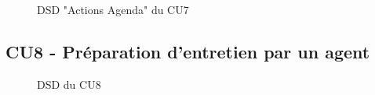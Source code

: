 \begin{figure}[H]
\noindent{}
\caption{DSD "Actions Agenda" du CU7}
\modificationFigure{}

\end{figure}


\subsection{CU8 - Préparation d’entretien par un agent}
\begin{figure}[H]
\noindent{}
\caption{DSD du CU8}
\end{figure}

